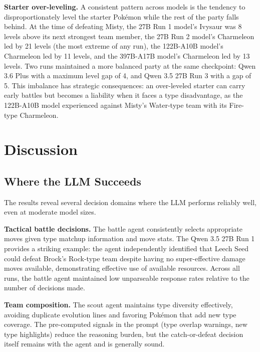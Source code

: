 \documentclass{article}
\begin{document}
\textbf{Starter over-leveling.} A consistent pattern across models is the tendency to disproportionately level the starter Pok\'{e}mon while the rest of the party falls behind. At the time of defeating Misty, the 27B Run 1 model's Ivysaur was 8 levels above its next strongest team member, the 27B Run 2 model's Charmeleon led by 21 levels (the most extreme of any run), the 122B-A10B model's Charmeleon led by 11 levels, and the 397B-A17B model's Charmeleon led by 13 levels. Two runs maintained a more balanced party at the same checkpoint: Qwen 3.6 Plus with a maximum level gap of 4, and Qwen 3.5 27B Run 3 with a gap of 5. This imbalance has strategic consequences: an over-leveled starter can carry early battles but becomes a liability when it faces a type disadvantage, as the 122B-A10B model experienced against Misty's Water-type team with its Fire-type Charmeleon.


\section{Discussion}
\label{sec:discussion}

\subsection{Where the LLM Succeeds}

The results reveal several decision domains where the LLM performs reliably well, even at moderate model sizes.

\textbf{Tactical battle decisions.} The battle agent consistently selects appropriate moves given type matchup information and move stats. The Qwen 3.5 27B Run 1 provides a striking example: the agent independently identified that Leech Seed could defeat Brock's Rock-type team despite having no super-effective damage moves available, demonstrating effective use of available resources. Across all runs, the battle agent maintained low unparseable response rates relative to the number of decisions made.

\textbf{Team composition.} The scout agent maintains type diversity effectively, avoiding duplicate evolution lines and favoring Pok\'{e}mon that add new type coverage. The pre-computed signals in the prompt (type overlap warnings, new type highlights) reduce the reasoning burden, but the catch-or-defeat decision itself remains with the agent and is generally sound.
\end{document}
